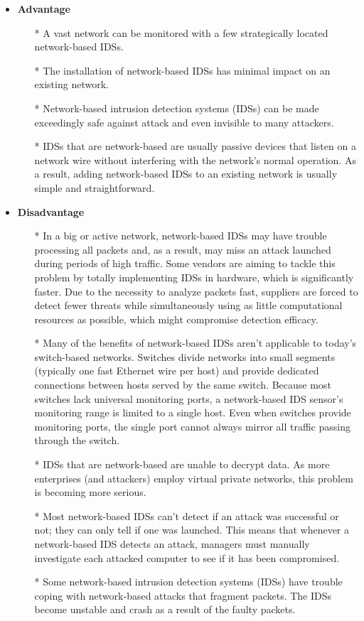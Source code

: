 \documentclass[12pt]{article}
\begin{document}
\begin{enumerate}
        \begin{itemize}
            \item \textbf{Advantage}
            \begin{itemize}
                \item[*] A vast network can be monitored with a few strategically located network-based IDSs.
                \item[*] The installation of network-based IDSs has minimal impact on an existing network. 
                \item[*] Network-based intrusion detection systems (IDSs) can be made exceedingly safe against attack and even invisible to many attackers.
                \item[*] IDSs that are network-based are usually passive devices that listen on a network wire without interfering with the network's normal operation. As a result, adding network-based IDSs to an existing network is usually simple and straightforward.
            \end{itemize}
        \item \textbf{Disadvantage}
        \begin{itemize}
            \item[*] In a big or active network, network-based IDSs may have trouble processing all packets and, as a result, may miss an attack launched during periods of high traffic. Some vendors are aiming to tackle this problem by totally implementing IDSs in hardware, which is significantly faster. Due to the necessity to analyze packets fast, suppliers are forced to detect fewer threats while simultaneously using as little computational resources as possible, which might compromise detection efficacy.
            \item[*] Many of the benefits of network-based IDSs aren't applicable to today's switch-based networks. Switches divide networks into small segments (typically one fast Ethernet wire per host) and provide dedicated connections between hosts served by the same switch. Because most switches lack universal monitoring ports, a network-based IDS sensor's monitoring range is limited to a single host. Even when switches provide monitoring ports, the single port cannot always mirror all traffic passing through the switch.
            \item[*] IDSs that are network-based are unable to decrypt data. As more enterprises (and attackers) employ virtual private networks, this problem is becoming more serious.
            \item[*] Most network-based IDSs can't detect if an attack was successful or not; they can only tell if one was launched. This means that whenever a network-based IDS detects an attack, managers must manually investigate each attacked computer to see if it has been compromised.
            \item[*] Some network-based intrusion detection systems (IDSs) have trouble coping with network-based attacks that fragment packets. The IDSs become unstable and crash as a result of the faulty packets.
        \end{itemize}
        \end{itemize}
        

\end{enumerate}
\end{document}
